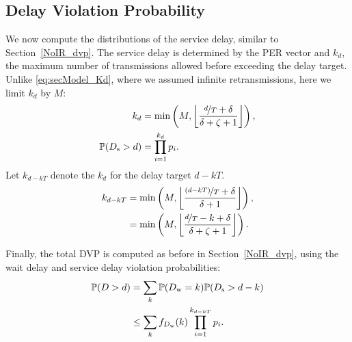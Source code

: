 \subsection{Delay Violation Probability}
We now compute the distributions of the service delay, similar to Section~\ref{NoIR_dvp}. 
The service delay is determined by the PER vector and $k_d$, the maximum number of transmissions allowed before exceeding the delay target. 
Unlike \eqref{eq:secModel_Kd}, where we assumed infinite retransmissions, here we limit $k_d$ by $M$:
\begin{align}
k_{d}&=\min\left(M,\left\lfloor\frac{\nicefrac{d}{T}+\delta}{\delta+{\zeta}+1}\right\rfloor\right),\label{eq:secIR_kd}\\
\mathbb{P}(D_{\mathrm{s}}>d)&=\prod_{i=1}^{k_{d}}p_i.\label{eq:secIR_servDelay}
\end{align}
Let $k_{d-kT}$ denote the $k_d$ for the delay target $d-kT$. 
\begin{align*}
    k_{d-kT}&=\min\left(M,\left\lfloor\frac{\nicefrac{(d-kT)}{T}+\delta}{\delta+1}\right\rfloor\right),\nonumber\\
    &=\min\left(M,\left\lfloor\frac{\nicefrac{d}{T}-k+\delta}{\delta+{\zeta}+1}\right\rfloor\right).
\end{align*}

Finally, the total DVP is computed as before in Section~\ref{NoIR_dvp}, using the wait delay and service delay violation probabilities:
\begin{align}
    \mathbb{P}(D>d) &=\sum_k \mathbb{P}(D_{\mathrm{w}}=k)\mathbb{P}(D_{\mathrm{s}}>d-k)\nonumber\\
    &\leq\sum_kf_{D_{\mathrm{w}}}(k)\prod_{i=1}^{k_{d-kT}}p_i.\label{eq:secIR_totDelay}
\end{align}
